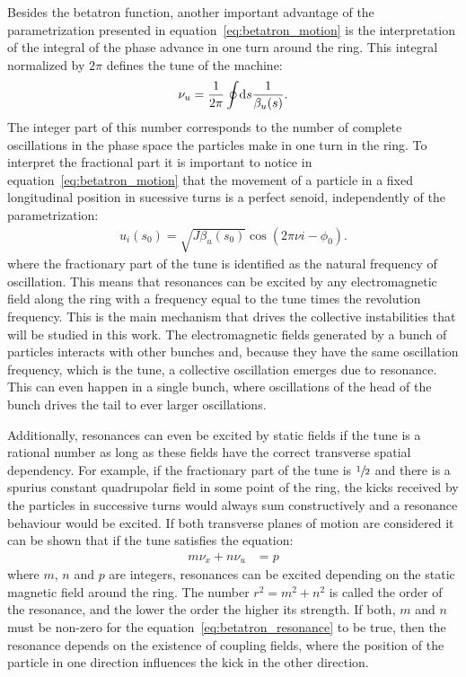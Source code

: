 \documentclass[
	12pt,				%
	openright,			%
	oneside,			%
	a4paper,		%
	chapter=TITLE,		%
	section=TITLE,		%
    brazil,				%
	english,			%
	sumario=tradicional,
	]{abntex2}
\begin{document}
	Besides the betatron function, another important advantage of the parametrization presented in equation~\eqref{eq:betatron_motion} is the interpretation of the integral of the phase advance in one turn around the ring. This integral normalized by $2\pi$ defines the tune of the machine:
	\begin{align}
		\nu_u = \frac{1}{2\pi}\oint\!\text{d}s \frac{1}{\beta_u(s)}.
	\end{align}
	The integer part of this number corresponds to the number of complete oscillations in the phase space the particles make in one turn in the ring. To interpret the fractional part it is important to notice in equation~\eqref{eq:betatron_motion} that the movement of a particle in a fixed longitudinal position in sucessive turns is a perfect senoid, independently of the parametrization:
	\begin{align}
		u_i(s_0) = \sqrt{J\beta_u(s_0)}\cos(2\pi\nu i -\phi_0).
	\end{align}
	where the fractionary part of the tune is identified as the natural frequency of oscillation. This means that resonances can be excited by any electromagnetic field along the ring with a frequency equal to the tune times the revolution frequency. This is the main mechanism that drives the collective instabilities that will be studied in this work. The electromagnetic fields generated by a bunch of particles interacts with other bunches and, because they have the same oscillation frequency, which is the tune, a collective oscillation emerges due to resonance. This can even happen in a single bunch, where oscillations of the head of the bunch drives the tail to ever larger oscillations.

	Additionally, resonances can even be excited by static fields if the tune is a rational number as long as these fields have the correct transverse spatial dependency. For example, if the fractionary part of the tune is $\sfrac12$ and there is a spurius constant quadrupolar field in some point of the ring, the kicks received by the particles in successive turns would always sum constructively and a resonance behaviour would be excited. If both transverse planes of motion are considered it can be shown that if the tune satisfies the equation:
	\begin{align}\label{eq:betatron_resonance}
		m\nu_x + n\nu_u &= p
	\end{align}
	where $m$, $n$ and $p$ are integers, resonances can be excited depending on the static magnetic field around the ring. The number $r^2 = m^2 + n^2$ is called the order of the resonance, and the lower the order the higher its strength. If both, $m$ and $n$ must be non-zero for the equation~\eqref{eq:betatron_resonance} to be true, then the resonance depends on the existence of coupling fields, where the position of the particle in one direction influences the kick in the other direction.
\end{document}
